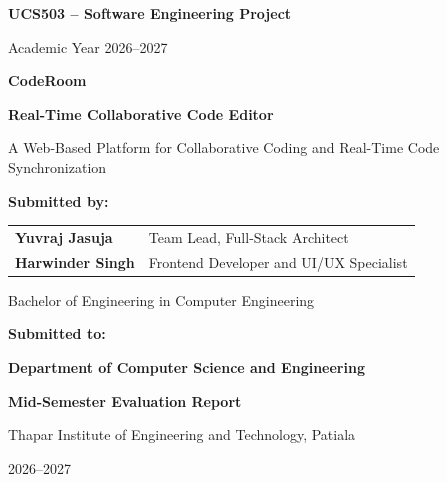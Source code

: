 \documentclass[12pt,a4paper,oneside]{report}
\begin{document}
\begin{titlepage}
    \centering

    \vspace*{0.5cm}

    {\Large\bfseries UCS503 -- Software Engineering Project\par}
    \vspace{0.3cm}

    {\large Academic Year 2026--2027\par}
    \vspace{1.5cm}

    {\Huge\bfseries CodeRoom\par}
    \vspace{0.3cm}

    {\Large\bfseries Real-Time Collaborative Code Editor\par}
    \vspace{0.5cm}

    {\large
    A Web-Based Platform for Collaborative Coding
    and Real-Time Code Synchronization\par}

    \vspace{2cm}

    {\large\textbf{Submitted by:}\par}
    \vspace{0.3cm}

    \begin{tabular}{ll}
        \textbf{Yuvraj Jasuja} & Team Lead, Full-Stack Architect
        \\[0.2cm]
        \textbf{Harwinder Singh} & Frontend Developer and UI/UX Specialist
    \end{tabular}

    \vspace{0.8cm}

    {\normalsize
    Bachelor of Engineering in Computer Engineering\par}

    \vspace{1.5cm}

    {\large\textbf{Submitted to:}\par}
    \vspace{0.2cm}

    {\large\textbf{Department of Computer Science and Engineering}\par}

    \vfill

    {\normalsize\textbf{Mid-Semester Evaluation Report}\par}
    \vspace{0.2cm}

    {\normalsize
    Thapar Institute of Engineering and Technology, Patiala\par}

    \vspace{0.3cm}

    {\normalsize 2026--2027\par}

\end{titlepage}
\end{document}

